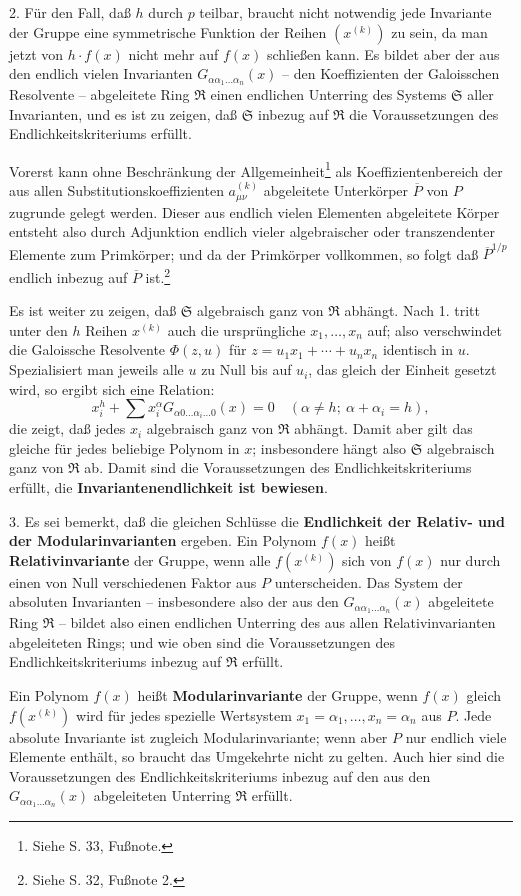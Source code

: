 \documentclass[11pt]{article}
\begin{document}
2. Für den Fall, daß $h$ durch $p$ teilbar, braucht nicht notwendig jede Invariante der Gruppe eine symmetrische Funktion der Reihen $(x^{(k)})$ zu sein, da man jetzt von $h\cdot f(x)$ nicht mehr auf $f(x)$ schließen kann. Es bildet aber der aus den endlich vielen Invarianten $G_{\alpha\alpha_1\ldots\alpha_n}(x)$ -- den Koeffizienten der Galoisschen Resolvente -- abgeleitete Ring $\mathfrak R$ einen endlichen Unterring des Systems $\mathfrak S$ aller Invarianten, und es ist zu zeigen, daß $\mathfrak S$ inbezug auf $\mathfrak R$ die Voraussetzungen des Endlichkeitskriteriums erfüllt.

Vorerst kann ohne Beschränkung der Allgemeinheit\footnote{Siehe S. 33, Fußnote.} als Koeffizientenbereich der aus allen Substitutionskoeffizienten $a_{\mu\nu}^{(k)}$ abgeleitete Unterkörper $\overline P$ von $P$ zugrunde gelegt werden. Dieser aus endlich vielen Elementen abgeleitete Körper entsteht also durch Adjunktion endlich vieler algebraischer oder transzendenter Elemente zum Primkörper; und da der Primkörper vollkommen, so folgt daß $\overline P^{1/p}$ endlich inbezug auf $\overline P$ ist.\footnote{Siehe S. 32, Fußnote 2.}

Es ist weiter zu zeigen, daß $\mathfrak S$ algebraisch ganz von $\mathfrak R$ abhängt. Nach 1. tritt unter den $h$ Reihen $x^{(k)}$ auch die ursprüngliche $x_1,\ldots,x_n$ auf; also verschwindet die Galoissche Resolvente $\Phi(z,u)$ für $z=u_1x_1+\cdots+u_nx_n$ identisch in $u$. Spezialisiert man jeweils alle $u$ zu Null bis auf $u_i$, das gleich der Einheit gesetzt wird, so ergibt sich eine Relation:
\[
 x_i^h+\sum x_i^\alpha G_{\alpha0\ldots\alpha_i\ldots0}(x)=0
 \quad (\alpha\ne h;\ \alpha+\alpha_i=h),
\]
die zeigt, daß jedes $x_i$ algebraisch ganz von $\mathfrak R$ abhängt. Damit aber gilt das gleiche für jedes beliebige Polynom in $x$; insbesondere hängt also $\mathfrak S$ algebraisch ganz von $\mathfrak R$ ab. Damit sind die Voraussetzungen des Endlichkeitskriteriums erfüllt, die \textbf{Invariantenendlichkeit ist bewiesen}.

3. Es sei bemerkt, daß die gleichen Schlüsse die \textbf{Endlichkeit der Relativ- und der Modularinvarianten} ergeben. Ein Polynom $f(x)$ heißt \textbf{Relativinvariante} der Gruppe, wenn alle $f(x^{(k)})$ sich von $f(x)$ nur durch einen von Null verschiedenen Faktor aus $P$ unterscheiden. Das System der absoluten Invarianten -- insbesondere also der aus den $G_{\alpha\alpha_1\ldots\alpha_n}(x)$ abgeleitete Ring $\mathfrak R$ -- bildet also einen endlichen Unterring des aus allen Relativinvarianten abgeleiteten Rings; und wie oben sind die Voraussetzungen des Endlichkeitskriteriums inbezug auf $\mathfrak R$ erfüllt.

Ein Polynom $f(x)$ heißt \textbf{Modularinvariante} der Gruppe, wenn $f(x)$ gleich $f(x^{(k)})$ wird für jedes spezielle Wertsystem $x_1=\alpha_1,\ldots,x_n=\alpha_n$ aus $P$. Jede absolute Invariante ist zugleich Modularinvariante; wenn aber $P$ nur endlich viele Elemente enthält, so braucht das Umgekehrte nicht zu gelten. Auch hier sind die Voraussetzungen des Endlichkeitskriteriums inbezug auf den aus den $G_{\alpha\alpha_1\ldots\alpha_n}(x)$ abgeleiteten Unterring $\mathfrak R$ erfüllt.
\end{document}
